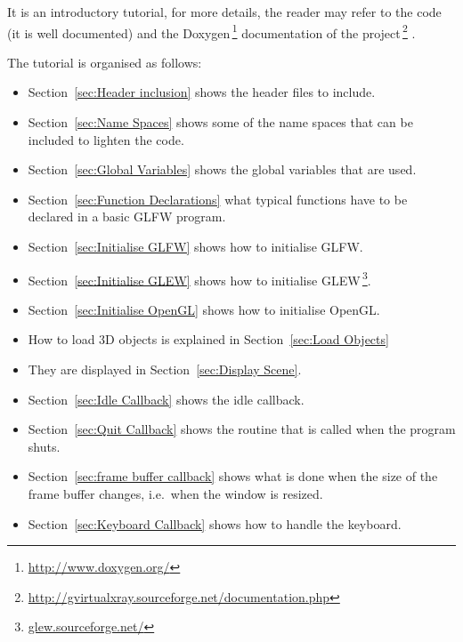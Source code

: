 \documentclass[11pt,oneside,a4paper,final]{article}
\begin{document}
It is an introductory tutorial, for more details, the reader may refer to the 
code (it is well documented) and the 
Doxygen\,\footnote{\url{http://www.doxygen.org/}} documentation of the 
project\,\footnote{\url{http://gvirtualxray.sourceforge.net/documentation.php}}
. 

The tutorial is organised as follows:
\begin{itemize}
 \item Section~\ref{sec:Header inclusion} shows the header files to include. 

 \item Section~\ref{sec:Name Spaces} shows some of the name spaces that can be 
	included to lighten the code. 

 \item Section~\ref{sec:Global Variables} shows the global variables that are 
	used. 

 \item Section~\ref{sec:Function Declarations} what typical functions have to 
	be declared in a basic GLFW program. 

 \item Section~\ref{sec:Initialise GLFW} shows how to initialise GLFW. 

 \item Section~\ref{sec:Initialise GLEW} shows how to initialise 
    GLEW\,\footnote{\url{glew.sourceforge.net/}}. 

 \item Section~\ref{sec:Initialise OpenGL} shows how to initialise OpenGL. 

 \item How to load 3D objects is explained in Section~\ref{sec:Load Objects} 

 \item They are displayed in Section~\ref{sec:Display Scene}.

 \item Section~\ref{sec:Idle Callback} shows the idle callback. 

 \item Section~\ref{sec:Quit Callback} shows the routine that is called when 
  the program shuts.

 \item Section~\ref{sec:frame buffer callback} shows what is done when the size 
of the frame buffer changes, i.e.~when the window is resized.

 \item Section~\ref{sec:Keyboard Callback} shows how to handle the keyboard.


\end{itemize}
\end{document}
